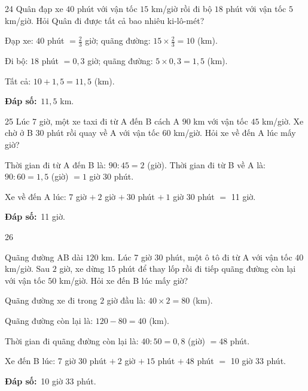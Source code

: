 \documentclass[11pt]{article}
\newif\ifsol \solfalse
\providecommand{\AnsWord}{Đáp số}
\newcommand{\dapso}[1]{\par\textbf{\AnsWord:}\ #1}
\newcommand{\probsol}[1]{%
  \begin{lrbox}{\solmeasure}\begin{minipage}{\dimexpr\linewidth-24pt\relax}#1\end{minipage}\end{lrbox}%
  \ifsol
    \begin{solbox}#1\end{solbox}%
  \else
    \setlength{\solht}{\dimexpr\ht\solmeasure+\dp\solmeasure+0.85cm\relax}%
    \ifdim\solht<1.35cm\setlength{\solht}{1.35cm}\fi
    \begin{tcolorbox}[colback=white,colframe=Line,boxrule=0.8pt,arc=5pt,
      left=8pt,right=8pt,top=4pt,bottom=4pt,height=\solht]{\footnotesize\color{Slate}\itshape\WorkWord}\end{tcolorbox}%
  \fi}
\newcommand{\gap}{\vspace{0.3cm}}
\def\WorkWord{Bài làm:}
\def\AnsWord{Đáp số}
\begin{document}
\gap
\begin{probbox}{24}{\relax}
Quân đạp xe $40$ phút với vận tốc $15$ km/giờ rồi đi bộ $18$ phút với vận tốc $5$ km/giờ. Hỏi Quân đi được tất cả bao nhiêu ki-lô-mét?
\end{probbox}
\probsol{
Đạp xe: $40$ phút $=\frac23$ giờ; quãng đường: $15\times\frac23=10$ (km).\par
Đi bộ: $18$ phút $=0{,}3$ giờ; quãng đường: $5\times0{,}3=1{,}5$ (km).\par
Tất cả: $10+1{,}5=11{,}5$ (km).
\dapso{$11{,}5$ km.}}
\gap
\begin{probbox}{25}{\relax}
Lúc 7 giờ, một xe taxi đi từ A đến B cách A $90$ km với vận tốc $45$ km/giờ. Xe chờ ở B $30$ phút rồi quay về A với vận tốc $60$ km/giờ. Hỏi xe về đến A lúc mấy giờ?
\end{probbox}
\probsol{
Thời gian đi từ A đến B là: $90:45=2$ (giờ). Thời gian đi từ B về A là: $90:60=1{,}5$ (giờ) $=1$ giờ $30$ phút.\par
Xe về đến A lúc: 7 giờ $+\ 2$ giờ $+\ 30$ phút $+\ 1$ giờ $30$ phút $=$ 11 giờ.
\dapso{11 giờ.}}
\gap
\begin{probbox}{26}{\relax}
\begin{minipage}[t]{0.56\linewidth}
Quãng đường AB dài $120$ km. Lúc 7 giờ 30 phút, một ô tô đi từ A với vận tốc $40$ km/giờ. Sau $2$ giờ, xe dừng $15$ phút để thay lốp rồi đi tiếp quãng đường còn lại với vận tốc $50$ km/giờ. Hỏi xe đến B lúc mấy giờ?
\end{minipage}\hfill
\begin{minipage}[t]{0.4\linewidth}\vspace{4pt}\centering
{}
\end{minipage}
\end{probbox}
\probsol{
Quãng đường xe đi trong $2$ giờ đầu là: $40\times2=80$ (km).\par
Quãng đường còn lại là: $120-80=40$ (km).\par
Thời gian đi quãng đường còn lại là: $40:50=0{,}8$ (giờ) $=48$ phút.\par
Xe đến B lúc: 7 giờ 30 phút $+\ 2$ giờ $+\ 15$ phút $+\ 48$ phút $=$ 10 giờ 33 phút.
\dapso{10 giờ 33 phút.}}
\end{document}
